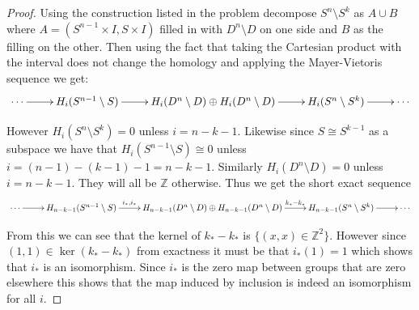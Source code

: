 \documentclass[10pt]{article}
\newcommand{\bb}[1]{\mathbb{#1}}
\theoremstyle{plain}
\theoremstyle{remark}
\begin{document}
\begin{proof}
  Using the construction listed in the problem decompose $S^n\setminus S^k$ as $A\cup B$
  where $A=(S^{n-1}\times I,S\times I)$ filled in with $D^n\setminus D$ on one side and $B$ as the
  filling on the other. Then using the fact that taking the Cartesian product
  with the interval does not change the homology and applying the Mayer-Vietoris
  sequence we get:
  \[
    \xymatrix{
      \cdots \ar[r] & H_i(S^{n-1}\setminus S) \ar[r] & H_i(D^n\setminus D)\oplus H_i(D^n\setminus D) \ar[r] & H_i(S^n\setminus S^k) \ar[r] & \cdots
    }
  \]

  However $H_i(S^n\setminus S^k)=0$ unless $i=n-k-1$. Likewise since $S\cong S^{k-1}$ as a
  subspace we have that $H_i(S^{n-1}\setminus S)\cong 0$ unless $i=(n-1)-(k-1)-1=n-k-1$.
  Similarly $H_i(D^n\setminus D)=0$ unless $i=n-k-1$. They will all be $\bb{Z}$ otherwise.
  Thus we get the short exact sequence
  \[
    \xymatrix{
      \cdots \ar[r] & H_{n-k-1}(S^{n-1}\setminus S) \ar[r]^-{i_*,i_*} & H_{n-k-1}(D^n\setminus D)\oplus H_{n-k-1}(D^n\setminus D) \ar[r]^-{k_*-k_*} & H_{n-k-1}(S^n\setminus S^k) \ar[r] & \cdots
    }
  \]

  From this we can see that the kernel of $k_*-k_*$ is $\{(x,x)\in \bb{Z}^2\}$.
  However since $(1,1)\in\ker (k_*-k_*)$ from exactness it must be that
  $i_*(1)=1$ which shows that $i_*$ is an isomorphism. Since $i_*$ is the
  zero map between groups that are zero elsewhere this shows that the
  map induced by inclusion is indeed an isomorphism for all $i$.
\end{proof}

\end{document}
